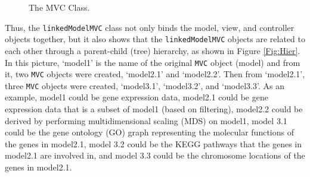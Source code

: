 \documentclass{article}[11pt]
\newcommand{\Robject}[1]{{\texttt{#1}}}
\newcommand{\Rclass}[1]{\texttt{#1}}
\begin{document}
\begin{figure}[ht]
  \begin{center}
    \caption{ The MVC Class. }
    \label{Fig:MVCClass}
  \end{center}
\end{figure}

Thus, the \Rclass{linkedModelMVC} class not only binds the model,
view, and controller objects together, but it also shows
that the \Robject{linkedModelMVC} objects are related to each other through a
parent-child (tree) hierarchy, as shown in Figure \ref{Fig:Hier}.  In this
picture, `model1' is the name of the original \Robject{MVC} object
(model) and from it, two \Robject{MVC} objects were created,
`model2.1' and `model2.2'. Then from `model2.1', three
\Robject{MVC} objects were created, `model3.1', `model3.2', and
`model3.3'.  As an example, model1 could be gene 
expression data, model2.1 could be gene expression data that is a subset of
model1 (based on filtering), model2.2 could be derived by performing
multidimensional scaling (MDS) on model1, model 3.1 could be the gene ontology
(GO) graph representing the molecular functions of the genes in model2.1,
model 3.2 could be the KEGG pathways that the genes in model2.1 are involved
in, and model 3.3 could be the chromosome locations of the genes in model2.1.
\end{document}
